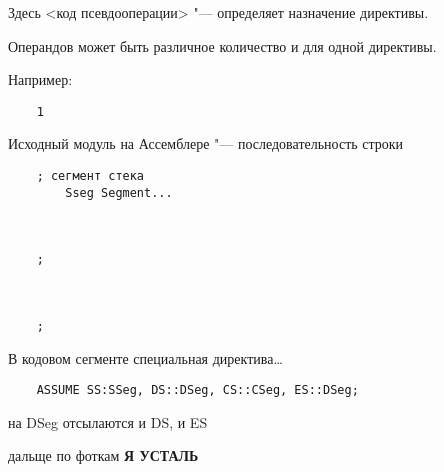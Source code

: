 Здесь <код псевдооперации> "--- определяет назначение директивы.

Операндов может быть различное количество и для одной директивы.

Например:
\begin{verbatim}
    1
\end{verbatim}

Исходный модуль на Ассемблере "--- последовательность строки

\begin{verbatim}
    ; сегмент стека
        Sseg Segment...



    ;



    ;
\end{verbatim}

В кодовом сегменте специальная директива\dots
\begin{verbatim}
    ASSUME SS:SSeg, DS::DSeg, CS::CSeg, ES::DSeg;
\end{verbatim}

на DSeg отсылаются и DS, и ES

дальще по фоткам \textbf{Я УСТАЛЬ}



